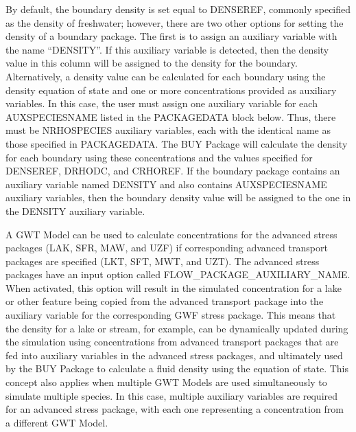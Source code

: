 By default, the boundary density is set equal to DENSEREF, commonly specified as the density of freshwater; however, there are two other options for setting the density of a boundary package.  The first is to assign an auxiliary variable with the name ``DENSITY''.  If this auxiliary variable is detected, then the density value in this column will be assigned to the density for the boundary.  Alternatively, a density value can be calculated for each boundary using the density equation of state and one or more concentrations provided as auxiliary variables.  In this case, the user must assign one auxiliary variable for each AUXSPECIESNAME listed in the PACKAGEDATA block below.  Thus, there must be NRHOSPECIES auxiliary variables, each with the identical name as those specified in PACKAGEDATA.  The BUY Package will calculate the density for each boundary using these concentrations and the values specified for DENSEREF, DRHODC, and CRHOREF.  If the boundary package contains an auxiliary variable named DENSITY and also contains AUXSPECIESNAME auxiliary variables, then the boundary density value will be assigned to the one in the DENSITY auxiliary variable.

A GWT Model can be used to calculate concentrations for the advanced stress packages (LAK, SFR, MAW, and UZF) if corresponding advanced transport packages are specified (LKT, SFT, MWT, and UZT).  The advanced stress packages have an input option called FLOW\_PACKAGE\_AUXILIARY\_NAME.  When activated, this option will result in the simulated concentration for a lake or other feature being copied from the advanced transport package into the auxiliary variable for the corresponding GWF stress package.  This means that the density for a lake or stream, for example, can be dynamically updated during the simulation using concentrations from advanced transport packages that are fed into auxiliary variables in the advanced stress packages, and ultimately used by the BUY Package to calculate a fluid density using the equation of state.  This concept also applies when multiple GWT Models are used simultaneously to simulate multiple species.  In this case, multiple auxiliary variables are required for an advanced stress package, with each one representing a concentration from a different GWT Model.  

